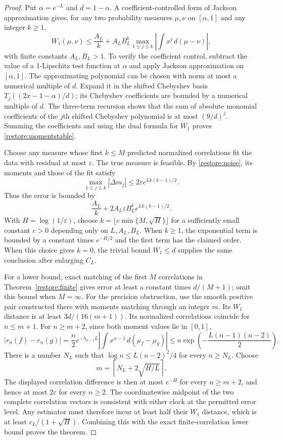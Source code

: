 \documentclass[11pt]{article}
\theoremstyle{definition}
\theoremstyle{remark}
\numberwithin{equation}{section}
\begin{document}
\begin{proof}
Put $\alpha=e^{-L}$ and $d=1-\alpha$.  A coefficient-controlled form
of Jackson approximation gives, for any two probability measures
$\mu,\nu$ on $[\alpha,1]$ and any integer $k\ge1$,
\begin{equation}\label{restore:momentstable}
 W_1(\mu,\nu)\le\frac{A_L}{k}
       +A_L B_L^k\max_{1\le j\le k}
                         \left|\int x^j\,d(\mu-\nu)\right|,
\end{equation}
with finite constants $A_L,B_L>1$.  To verify the coefficient control,
subtract the value of a 1-Lipschitz test function at $\alpha$ and apply
Jackson approximation on $[\alpha,1]$.  The approximating polynomial
can be chosen with norm at most a numerical multiple of $d$.  Expand
it in the shifted Chebyshev basis
$T_j((2x-1-\alpha)/d)$; its Chebyshev coefficients are bounded by a
numerical multiple of $d$.  The three-term recursion shows that the
sum of absolute monomial coefficients of the $j$th shifted Chebyshev
polynomial is at most $(9/d)^j$.  Summing the coefficients and using
the dual formula for $W_1$ proves \eqref{restore:momentstable}.

Choose any measure whose first $k\le M$ predicted normalized
correlations fit the data with residual at most $\varepsilon$.
The true measure is feasible.  By \eqref{restore:noise}, its moments
and those of the fit satisfy
\[
 \max_{1\le j\le k}|\Delta m_j|
           \le 2\varepsilon e^{Lk(k-1)/2}.
\]
Thus the error is bounded by
\[
 \frac{A_L}{k}
               +2A_L\varepsilon B_L^ke^{Lk(k-1)/2}.
\]
With $H=\log(1/\varepsilon)$, choose
$k=\lfloor c\min\{M,\sqrt H\}\rfloor$ for a sufficiently small
constant $c>0$ depending only on $L,A_L,B_L$.  When $k\ge1$, the
exponential term is bounded by a constant times $e^{-H/2}$ and the
first term has the claimed order.  When this choice gives $k=0$,
the trivial bound $W_1\le d$ supplies the same conclusion after
enlarging $C_L$.

For a lower bound, exact matching of the first $M$ correlations in
Theorem~\ref{restore:finite} gives error at least a constant times
$d/(M+1)$; omit this bound when $M=\infty$.  For the precision
obstruction, use the smooth positive pair constructed there with
moments matching through an integer $m$.  Its $W_1$ distance is at
least $3d/(16(m+1))$.  Its normalized correlations coincide for
$n\le m+1$.  For $n\ge m+2$, since both moment values lie in $[0,1]$,
\[
 |r_n(f)-r_n(g)|
   =\frac n2 e^{-\lambda_{n-1}L}
       \left|\int x^{n-1}\,d(\mu_f-\mu_g)\right|
   \le n\exp\left(-\frac{L(n-1)(n-2)}2\right).
\]
There is a number $N_L$ such that
$\log n\le L(n-2)^2/4$ for every $n\ge N_L$.  Choose
\[
          m=\left\lceil N_L+2\sqrt{H/L}\right\rceil.
\]
The displayed correlation difference is then at most $e^{-H}$ for
every $n\ge m+2$, and hence at most $2\varepsilon$ for every
$n\ge2$.  The coordinatewise midpoint of the two complete correlation
vectors is consistent with either clock at the permitted error level.
Any estimator must therefore incur at least half their $W_1$ distance,
which is at least $c_L/(1+\sqrt H)$.  Combining this with the exact
finite-correlation lower bound proves the theorem.
\end{proof}
\end{document}
